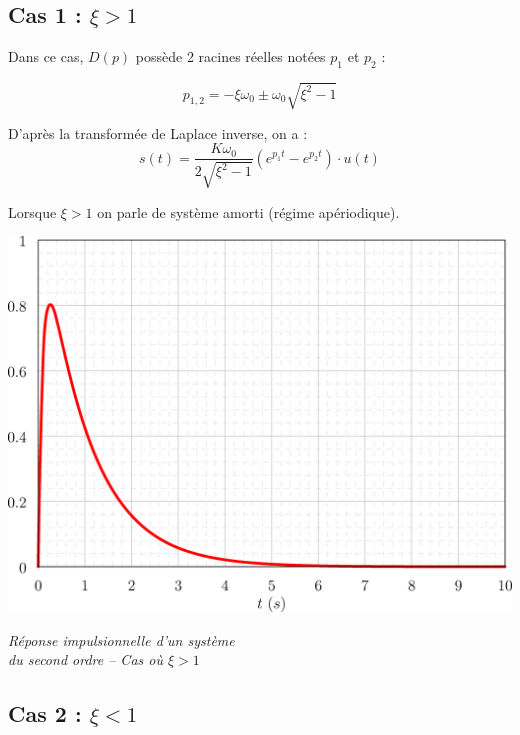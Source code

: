 \documentclass[10pt,fleqn]{article} %
\begin{document}
\subsection{Cas 1 : $\xi>1$}
\begin{minipage}[c]{.46\linewidth}
Dans ce cas, $D(p)$ possède 2 racines réelles notées $p_1$ et $p_2$ :

$$
p_{1,2} 
=-\xi\omega_0\pm\omega_0\sqrt{ \xi^2 -1}
$$


D'après la transformée de Laplace inverse, on a : 
$$
s(t)=\dfrac{K\omega_0}{2\sqrt{\xi^2-1}} \left(e^{p_1 t}-e^{p_2 t} \right)\cdot
u(t) 
$$

Lorsque $\xi>1$ on parle de système amorti (régime apériodique).
\end{minipage} \hfill
\begin{minipage}[c]{.46\linewidth}
\begin{center}
\includegraphics[width=.9\textwidth]{images/ordre2_dirac_1}

\textit{Réponse impulsionnelle d'un système \\ du second ordre -- Cas où $\xi > 1$}
\end{center}
\end{minipage}

\subsection{Cas 2 : $\xi<1$}
\end{document}
